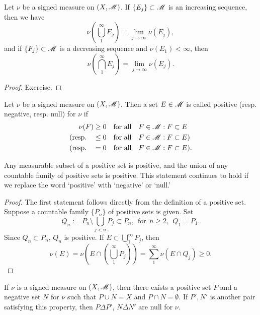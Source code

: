 \documentclass[12pt]{article} %
\begin{document}
\begin{proposition}
    Let $\nu$ be a signed measure on $(X, \mathscr{M})$. If $\{E_j\} \subset \mathscr{M}$ is an increasing sequence, then we have \[\nu\left(\bigcup_1^\infty E_j \right) = \lim_{j \to \infty} \nu(E_j),\] and if $\{F_j\} \subset \mathscr{M}$ is a decreasing sequence and $\nu(E_1) < \infty$, then \[\nu\left(\bigcap_1^\infty E_j \right) = \lim_{j \to \infty} \nu(E_j).\]
\end{proposition}

\begin{proof}
    Exercise.
\end{proof}

\begin{definition}
    Let $\nu$ be a signed measure on $(X, \mathscr{M})$. Then a set $E \in \mathscr{M}$ is called positive (resp. negative, resp. null) for $\nu$ if \begin{align*}
        \nu(F) &\geq 0 \ \ \ \text{for all} \ \ \ F \in \mathscr{M} : F \subset E\\
        \text{(resp.} \ \ \ &\leq 0 \ \ \ \text{for all} \ \ \ F \in \mathscr{M} : F \subset E \text{)}\\
        \text{(resp.} \ \ \ &= 0 \ \ \ \text{for all} \ \ \ F \in \mathscr{M} : F \subset E \text{)}.
    \end{align*}
\end{definition}

\begin{lemma}
    Any measurable subset of a positive set is positive, and the union of any countable family of positive sets is positive. This statement continues to hold if we replace the word `positive' with `negative' or `null.'
\end{lemma}

\begin{proof}
    The first statement follows directly from the definition of a positive set. Suppose a countable family $\{P_n\}$ of positive sets is given. Set \[Q_n := P_n \setminus \bigcup_{j < n} P_j \subset P_n, \ \ \text{for} \ \ n \geq 2, \ \  Q_1 = P_1.\] Since $Q_n \subset P_n$, $Q_n$ is positive. If $E \subset \bigcup_1^\infty P_j$, then \[\nu(E) = \nu\left(E \cap \left(\bigcup_1^\infty P_j\right)\right) = \sum_1^\infty \nu(E \cap Q_j) \geq 0.\]
\end{proof}

\begin{lemma}\label{lem:hahn}
    If $\nu$ is a signed measure on $(X, \mathscr{M})$, then there exists a positive set $P$ and a negative set $N$ for $\nu$ such that $P \cup N = X$ and $P \cap N = \emptyset$. If $P', N'$ is another pair satisfying this property, then $P \Delta P'$, $N \Delta N'$ are null for $\nu$.
\end{lemma}
\end{document}

